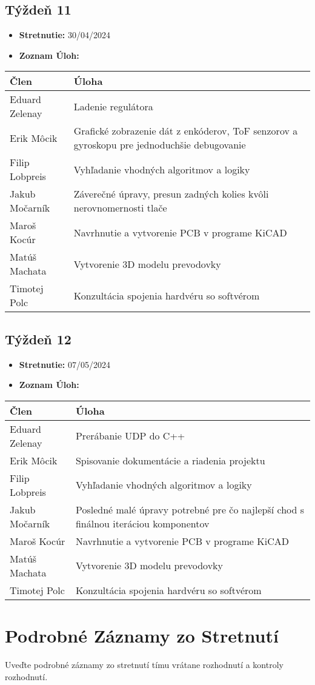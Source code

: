 \subsection{Týždeň 11}
\begin{itemize}
    \item \textbf{Stretnutie:} 30/04/2024
    \item \textbf{Zoznam Úloh:}
\end{itemize}

\begin{tabular}{|l|l|}
    \hline
    \textbf{Člen} & \textbf{Úloha} \\
    \hline
    Eduard Zelenay & Ladenie regulátora \\
    Erik Môcik & Grafické zobrazenie dát z enkóderov, ToF senzorov a gyroskopu pre jednoduchšie debugovanie \\
    Filip Lobpreis & Vyhľadanie vhodných algoritmov a logiky \\
    Jakub Močarník & Záverečné úpravy, presun zadných kolies kvôli nerovnomernosti tlače \\
    Maroš Kocúr & Navrhnutie a vytvorenie PCB v programe KiCAD \\
    Matúš Machata & Vytvorenie 3D modelu prevodovky \\
    Timotej Polc & Konzultácia spojenia hardvéru so softvérom \\
    \hline
\end{tabular}
\subsection{Týždeň 12}
\begin{itemize}
    \item \textbf{Stretnutie:} 07/05/2024
    \item \textbf{Zoznam Úloh:}
\end{itemize}

\begin{tabular}{|l|l|}
    \hline
    \textbf{Člen} & \textbf{Úloha} \\
    \hline
    Eduard Zelenay & Prerábanie UDP do C++ \\
    Erik Môcik & Spisovanie dokumentácie a riadenia projektu \\
    Filip Lobpreis & Vyhľadanie vhodných algoritmov a logiky \\
    Jakub Močarník & Posledné malé úpravy potrebné pre čo najlepší chod s finálnou iteráciou komponentov \\
    Maroš Kocúr & Navrhnutie a vytvorenie PCB v programe KiCAD \\
    Matúš Machata & Vytvorenie 3D modelu prevodovky \\
    Timotej Polc & Konzultácia spojenia hardvéru so softvérom \\
    \hline
\end{tabular}



\section{Podrobné Záznamy zo Stretnutí}

Uveďte podrobné záznamy zo stretnutí tímu vrátane rozhodnutí a kontroly rozhodnutí.
